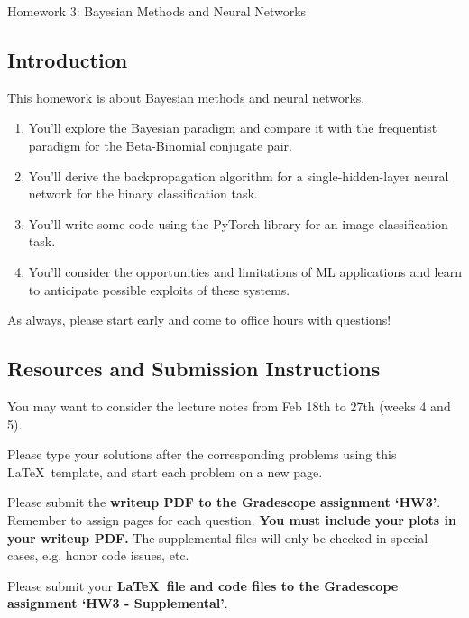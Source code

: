 \documentclass[submit]{harvardml}
\begin{document}
\begin{center}
  {\Large Homework 3: Bayesian Methods and Neural Networks}\\
\end{center}

\subsection*{Introduction}

This homework is about Bayesian methods and neural networks.

\begin{enumerate}
  \item You'll explore the Bayesian paradigm and compare it with the frequentist paradigm for the Beta-Binomial conjugate pair.
  \item You'll derive the backpropagation algorithm for a single-hidden-layer neural network for the binary classification task.
  \item You'll write some code using the PyTorch library for an image classification task.
  \item You'll consider the opportunities and limitations of ML applications and learn to anticipate possible exploits of these systems.
\end{enumerate}

As always, please start early and come to office hours with questions!

\subsection*{Resources and Submission Instructions}
You may want to consider the lecture notes from Feb 18th to 27th (weeks 4 and 5).

Please type your solutions after the corresponding problems using this
\LaTeX\ template, and start each problem on a new page.

Please submit the \textbf{writeup PDF to the Gradescope assignment `HW3'}. Remember to assign pages for each question.  \textbf{You must include your plots in your writeup PDF. } The supplemental files will only be checked in special cases, e.g. honor code issues, etc.

Please submit your \textbf{\LaTeX\ file and code files to the Gradescope assignment `HW3 - Supplemental'}. \\


\newpage

\end{document}
